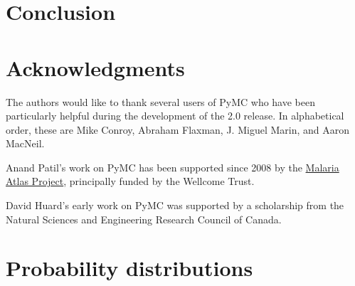 \documentclass[]{jss_mod}
\begin{document}
\section{Conclusion}
\label{conclusion}


\section[Acknowledgments]{Acknowledgments}
\label{chap:acknowledge}
The authors would like to thank several users of PyMC who have been particularly helpful during the development of the 2.0 release. In alphabetical order, these are Mike Conroy, Abraham Flaxman, J. Miguel Marin, and Aaron MacNeil.

Anand Patil's work on PyMC has been supported since 2008 by the \href{http://www.map.ox.ac.uk}{Malaria Atlas
Project}, principally funded by the Wellcome Trust.

David Huard's early work on PyMC was supported by a scholarship from the Natural Sciences and Engineering Research Council of Canada. 
\newpage
\appendix
% 

\section[Distributions]{Probability distributions}
\label{chap:distributions}

\newpage

\nocite{Bernardo:1992fk}
\nocite{r} 
\nocite{jags} 
\nocite{winbugs}
\nocite{hbc} 

\end{document}
